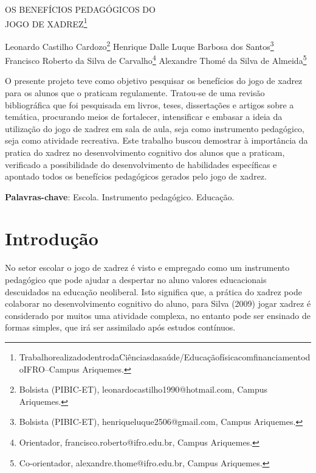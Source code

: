 \documentclass[article,12pt,onesidea,4paper,english,brazil]{abntex2}
\begin{document}
	
	
	\frenchspacing 
	
	\begin{center}
		\LARGE OS BENEFÍCIOS PEDAGÓGICOS DO\\JOGO DE XADREZ\footnote{TrabalhorealizadodentrodaCiênciasdasaúde/EducaçãofísicacomfinanciamentodoIFRO–Campus Ariquemes.}
		
		\normalsize
		Leonardo Castilho Cardozo\footnote{Bolsista (PIBIC-ET), leonardocastilho1990@hotmail.com, Campus Ariquemes.} 
		Henrique Dalle Luque Barbosa dos Santos\footnote{Bolsista (PIBIC-ET), henriqueluque2506@gmail.com, Campus Ariquemes.} \\
		Francisco Roberto da Silva de Carvalho\footnote{Orientador, francisco.roberto@ifro.edu.br, Campus Ariquemes.} 
		Alexandre Thomé da Silva de Almeida\footnote{Co-orientador, alexandre.thome@ifro.edu.br, Campus Ariquemes.} 
	\end{center}
	
	\begin{resumoumacoluna}
		O presente projeto teve como objetivo pesquisar os benefícios do jogo de xadrez para os alunos que o praticam regulamente. Tratou-se de uma revisão bibliográfica que foi pesquisada em livros, teses, dissertações e artigos sobre a temática, procurando meios de fortalecer, intensificar e embasar a ideia da utilização do jogo de xadrez em sala de aula, seja como instrumento pedagógico, seja como atividade recreativa. Este trabalho buscou demostrar à importância da pratica do xadrez no desenvolvimento cognitivo dos alunos que a praticam, verificado a possibilidade do desenvolvimento de habilidades específicas e apontado todos os benefícios pedagógicos gerados pelo jogo de xadrez.
		
		\vspace{\onelineskip}
		
		\noindent
		\textbf{Palavras-chave}: Escola. Instrumento pedagógico. Educação.
	\end{resumoumacoluna}
	
	\section*{Introdução}
	
	No setor escolar o jogo de xadrez é visto e empregado como um instrumento pedagógico que pode ajudar a despertar no aluno valores educacionais descuidados na educação neoliberal. Isto significa que, a prática do xadrez pode colaborar no desenvolvimento cognitivo do aluno, para Silva (2009) jogar xadrez é considerado por muitos uma atividade complexa, no entanto pode ser ensinado de formas simples, que irá ser assimilado após estudos contínuos.
	
\end{document}
